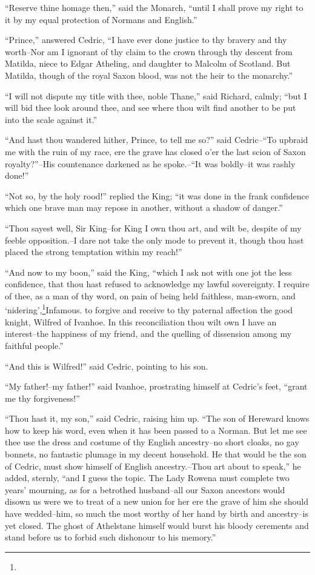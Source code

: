 ``Reserve thine homage then,'' said the Monarch, ``until I shall prove
my right to it by my equal protection of Normans and English.''

``Prince,'' answered Cedric, ``I have ever done justice to thy bravery
and thy worth--Nor am I ignorant of thy claim to the crown through thy
descent from Matilda, niece to Edgar Atheling, and daughter to Malcolm
of Scotland. But Matilda, though of the royal Saxon blood, was not the
heir to the monarchy.''

``I will not dispute my title with thee, noble Thane,'' said Richard,
calmly; ``but I will bid thee look around thee, and see where thou wilt
find another to be put into the scale against it.''

``And hast thou wandered hither, Prince, to tell me so?'' said
Cedric--``To upbraid me with the ruin of my race, ere the grave has
closed o'er the last scion of Saxon royalty?''--His countenance darkened
as he spoke.--``It was boldly--it was rashly done!''

``Not so, by the holy rood!'' replied the King; ``it was done in the
frank confidence which one brave man may repose in another, without a
shadow of danger.''

``Thou sayest well, Sir King--for King I own thou art, and wilt be,
despite of my feeble opposition.--I dare not take the only mode to
prevent it, though thou hast placed the strong temptation within my
reach!''

``And now to my boon,'' said the King, ``which I ask not with one jot
the less confidence, that thou hast refused to acknowledge my lawful
sovereignty. I require of thee, as a man of thy word, on pain of being
held faithless, man-sworn, and `nidering',\footnote{}Infamous. to forgive
and receive to thy paternal affection the good knight, Wilfred of Ivanhoe.
In this reconciliation thou wilt own I have an interest--the happiness
of my friend, and the quelling of dissension among my faithful people.''

``And this is Wilfred!'' said Cedric, pointing to his son.

``My father!--my father!'' said Ivanhoe, prostrating himself at Cedric's
feet, ``grant me thy forgiveness!''

``Thou hast it, my son,'' said Cedric, raising him up. ``The son of
Hereward knows how to keep his word, even when it has been passed to a
Norman. But let me see thee use the dress and costume of thy English
ancestry--no short cloaks, no gay bonnets, no fantastic plumage in my
decent household. He that would be the son of Cedric, must show himself
of English ancestry.--Thou art about to speak,'' he added, sternly,
``and I guess the topic. The Lady Rowena must complete two years'
mourning, as for a betrothed husband--all our Saxon ancestors would
disown us were we to treat of a new union for her ere the grave of him
she should have wedded--him, so much the most worthy of her hand by
birth and ancestry--is yet closed. The ghost of Athelstane himself would
burst his bloody cerements and stand before us to forbid such dishonour
to his memory.''

